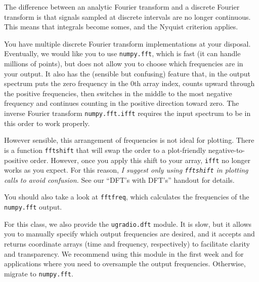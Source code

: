 \documentclass[11pt,preprint]{aastex}
\begin{document}
\noindent
The difference between an analytic Fourier transform and a discrete Fourier transform is
that signals sampled at discrete intervals are no longer continuous. This means that
integrals become somes, and the Nyquist criterion applies.

You have multiple discrete Fourier transform implementations at your disposal.  Eventually, we would like you
to use \verb$numpy.fft$, which is fast (it can handle millions of points), but does not allow you to choose
which frequencies are in your output. It also has the (sensible but confusing) feature that, in the output
spectrum puts the zero frequency in the 0th array index, counts upward through the positive frequencies, then
switches in the middle to the most negative frequency and continues counting in the positive direction
toward zero.  The inverse Fourier transform \verb$numpy.fft.ifft$ requires the input spectrum to be in this
order to work properly.

However sensible, this arrangement of frequencies is not ideal for plotting. There is a function \verb$fftshift$
that will swap the order to a plot-friendly negative-to-positive order. However, once you apply this shift to
your array, \verb$ifft$ no longer works as you expect.  For this reason, {\it I suggest only using 
\verb$fftshift$ in plotting calls to avoid confusion.}
See our ``DFT's with DFT's'' handout for details.

You should also take a look at \verb$fftfreq$, which calculates the frequencies of the \verb$numpy.fft$ output.

For this class, we also provide the \verb$ugradio.dft$ module.  It is slow, but it allows you to manually specify
which output frequencies are desired, and it accepts and returns coordinate arrays (time and frequency, respectively)
to facilitate clarity and transparency. We recommend using this module in the first week and for applications where
you need to oversample the output frequencies. Otherwise, migrate to \verb$numpy.fft$.
\end{document}
